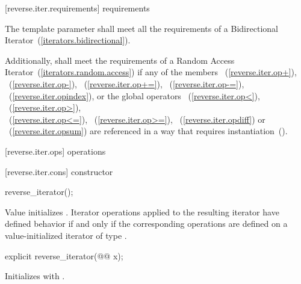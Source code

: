 \begin{removedblock}
[reverse.iter.requirements]{ requirements}

\pnum
The template parameter
shall meet all the requirements of a Bidirectional Iterator~(\ref{iterators.bidirectional}).

\pnum
Additionally,
shall meet the requirements of a Random Access Iterator~(\ref{iterators.random.access})
if any of the members
~(\ref{reverse.iter.op+}),
~(\ref{reverse.iter.op-}),
~(\ref{reverse.iter.op+=}),
~(\ref{reverse.iter.op-=}),
~(\ref{reverse.iter.opindex}),
or the global operators
~(\ref{reverse.iter.op<}),
~(\ref{reverse.iter.op>}),\\
~(\ref{reverse.iter.op<=}),
~(\ref{reverse.iter.op>=}),
~(\ref{reverse.iter.opdiff})
or
~(\ref{reverse.iter.opsum})
are referenced in a way that requires instantiation~().
\end{removedblock}

[reverse.iter.ops]{ operations}

[reverse.iter.cons]{ constructor}

%
\begin{itemdecl}
reverse_iterator();
\end{itemdecl}

\begin{itemdescr}
\pnum
\effects
Value initializes
.
Iterator operations applied to the resulting iterator have defined behavior
if and only if the corresponding operations are defined on a
value-initialized iterator of type
.
\end{itemdescr}

%

\begin{itemdecl}
explicit reverse_iterator(@@ x);
\end{itemdecl}

\begin{itemdescr}
\pnum
\effects
Initializes
with .
\end{itemdescr}

